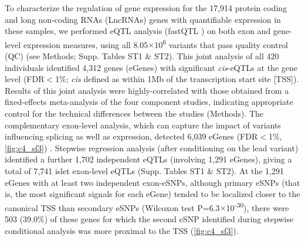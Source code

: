 To characterize the regulation of gene expression for the 17,914 protein coding and long non-coding RNAs (LncRNAs) genes with quantifiable expression in these samples, we performed eQTL analysis (fastQTL \cite{ongenFastEfficientQTL2016}) on both exon and gene-level expression measures, using all 8.05$\times$10\textsuperscript{6} variants that pass quality control (QC) (see Methods; Supp. Tables ST1 \& ST2). This joint analysis of all 420 individuals identified 4,312 genes (eGenes) with significant \textit{cis}-eQTLs at the gene level (FDR$<$1\%; \textit{cis} defined as within 1Mb of the transcription start site [TSS]). Results of this joint analysis were highly-correlated with those obtained from a fixed-effects meta-analysis of the four component studies, indicating appropriate control for the technical differences between the studies (Methods). The complementary exon-level analysis, which can capture the impact of variants influencing splicing as well as expression, detected 6,039 eGenes (FDR$<$1\%, \ref{fig:c4_sf3}) \cite{montgomeryTranscriptomeGeneticsUsing2010, lappalainenTranscriptomeGenomeSequencing2013}. Stepwise regression analysis (after conditioning on the lead variant) identified a further 1,702 independent eQTLs (involving 1,291 eGenes), giving a total of 7,741 islet exon-level eQTLs (Supp. Tables ST1 \& ST2). At the 1,291 eGenes with at least two independent exon-eSNPs, although primary eSNPs (that is, the most significant signals for each eGene) tended to be localized closer to the canonical TSS than secondary eSNPs (Wilcoxon test P=6.3$\times$10\textsuperscript{-30}), there were 503 (39.0\%) of these genes for which the second eSNP identified during stepwise conditional analysis was more proximal to the TSS (\ref{fig:c4_sf3}).

